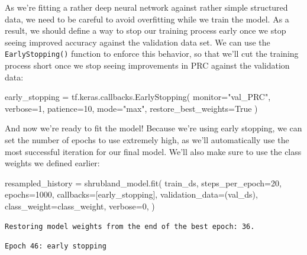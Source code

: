 \documentclass[
  letterpaper,
  DIV=11,
  numbers=noendperiod]{scrartcl}
\newenvironment{Shaded}{\begin{snugshade}}{\end{snugshade}}
\newcommand{\DecValTok}[1]{\textcolor[rgb]{0.68,0.00,0.00}{#1}}
\newcommand{\NormalTok}[1]{\textcolor[rgb]{0.00,0.23,0.31}{#1}}
\newcommand{\OperatorTok}[1]{\textcolor[rgb]{0.37,0.37,0.37}{#1}}
\newcommand{\StringTok}[1]{\textcolor[rgb]{0.13,0.47,0.30}{#1}}
\newcommand{\VariableTok}[1]{\textcolor[rgb]{0.07,0.07,0.07}{#1}}
\begin{document}
As we're fitting a rather deep neural network against rather simple
structured data, we need to be careful to avoid overfitting while we
train the model. As a result, we should define a way to stop our
training process early once we stop seeing improved accuracy against the
validation data set. We can use the \texttt{EarlyStopping()} function to
enforce this behavior, so that we'll cut the training process short once
we stop seeing improvements in PRC against the validation data:

\begin{Shaded}
\begin{Highlighting}[]
\NormalTok{early\_stopping }\OperatorTok{=}\NormalTok{ tf.keras.callbacks.EarlyStopping(}
\NormalTok{    monitor}\OperatorTok{=}\StringTok{"val\_PRC"}\NormalTok{, verbose}\OperatorTok{=}\DecValTok{1}\NormalTok{, patience}\OperatorTok{=}\DecValTok{10}\NormalTok{, mode}\OperatorTok{=}\StringTok{"max"}\NormalTok{, restore\_best\_weights}\OperatorTok{=}\VariableTok{True}
\NormalTok{)}
\end{Highlighting}
\end{Shaded}

And now we're ready to fit the model! Because we're using early
stopping, we can set the number of epochs to use extremely high, as
we'll automatically use the most successful iteration for our final
model. We'll also make sure to use the class weights we defined earlier:

\begin{Shaded}
\begin{Highlighting}[]
\NormalTok{resampled\_history }\OperatorTok{=}\NormalTok{ shrubland\_model.fit(}
\NormalTok{    train\_ds,}
\NormalTok{    steps\_per\_epoch}\OperatorTok{=}\DecValTok{20}\NormalTok{,}
\NormalTok{    epochs}\OperatorTok{=}\DecValTok{1000}\NormalTok{,}
\NormalTok{    callbacks}\OperatorTok{=}\NormalTok{[early\_stopping],}
\NormalTok{    validation\_data}\OperatorTok{=}\NormalTok{(val\_ds),}
\NormalTok{    class\_weight}\OperatorTok{=}\NormalTok{class\_weight,}
\NormalTok{    verbose}\OperatorTok{=}\DecValTok{0}\NormalTok{,}
\NormalTok{)}
\end{Highlighting}
\end{Shaded}

\begin{verbatim}
Restoring model weights from the end of the best epoch: 36.
\end{verbatim}

\begin{verbatim}
Epoch 46: early stopping
\end{verbatim}
\end{document}
